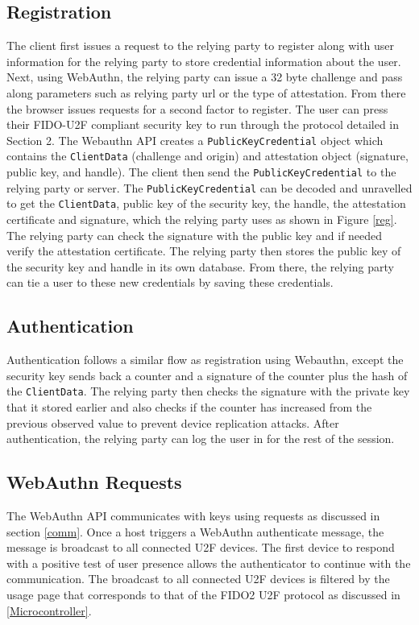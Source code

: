 \documentclass[acmtog,review]{acmart}
\begin{document}
\subsection{Registration}
The client first issues a request to the relying party to register along with user information for the relying party to store credential information about the user. Next, using WebAuthn, the relying party can issue a 32 byte challenge and pass along parameters such as relying party url or the type of attestation. From there the browser issues requests for a second factor to register. The user can press their FIDO-U2F compliant security key to run through the protocol detailed in Section 2. 
The Webauthn API creates a \texttt{PublicKeyCredential} object which contains the \texttt{ClientData} (challenge and origin) and attestation object (signature, public key, and handle). The client then send the \texttt{PublicKeyCredential} to the relying party or server. The \texttt{PublicKeyCredential} can be decoded and unravelled to get the \texttt{ClientData}, public key of the security key, the handle, the attestation certificate and signature, which the relying party uses as shown in Figure \ref{reg}. The relying party can check the signature with the public key and if needed verify the attestation certificate. The relying party then stores the public key of the security key and handle in its own database. From there, the relying party can tie a user to these new credentials by saving these credentials.

\subsection{Authentication}
Authentication follows a similar flow as registration using Webauthn, except the security key sends back a counter and a signature of the counter plus the hash of the \texttt{ClientData}. The relying party then checks the signature with the private key that it stored earlier and also checks if the counter has increased from the previous observed value to prevent device replication attacks. After authentication, the relying party can log the user in for the rest of the session.

\subsection{WebAuthn Requests}

The WebAuthn API communicates with keys using requests as discussed in section \ref{comm}. 
Once a host triggers a WebAuthn authenticate message, the message is broadcast to all
connected U2F devices. The first device to respond with a positive test of user presence
allows the authenticator to continue with the communication. The broadcast to all
connected U2F devices is filtered by the usage page that corresponds to that of the FIDO2 
U2F protocol as discussed in \ref{Microcontroller}.
\end{document}
